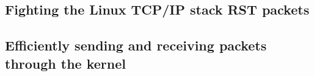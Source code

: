 \documentclass[10pt,a4paper,british]{article}
\begin{document}
\subsection{Fighting the Linux TCP/IP stack RST packets}

\subsection{Efficiently sending and receiving packets through the kernel~\cite{tpacket}}

\printbibliography{}
\end{document}
